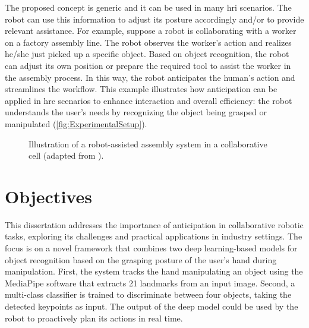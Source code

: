 The proposed concept is generic and it can be used in many \acf{hri} scenarios. The robot can use this information to adjust its posture accordingly and/or to provide relevant assistance. For example, suppose a robot is collaborating with a worker on a factory assembly line. The robot observes the worker's action and realizes he/she just picked up a specific object. Based on object recognition, the robot can adjust its own position or prepare the required tool to assist the worker in the assembly process. In this way, the robot anticipates the human's action and streamlines the workflow. This example illustrates how anticipation can be applied in \acs{hrc} scenarios to enhance interaction and overall efficiency: the robot understands the user's needs by recognizing the object being grasped or manipulated (\autoref{fig:ExperimentalSetup}).

\begin{figure}[ht]
    \captionsetup{width=0.7\textwidth}
    \centering
    {\fontsize{10}{12}\selectfont}
    \caption[Illustration of a robot-assisted assembly system in a collaborative cell.]{Illustration of a robot-assisted assembly system in a collaborative cell (adapted from \cite{Malik2020}).}
    \label{fig:ExperimentalSetup}
\end{figure}

\section{Objectives}

This dissertation addresses the importance of anticipation in collaborative robotic tasks, exploring its challenges and practical applications in industry settings. The focus is on a novel framework that combines two deep learning-based models for object recognition based on the grasping posture of the user's hand during manipulation. First, the system tracks the hand manipulating an object using the MediaPipe software \cite{Lugaresi2019} that extracts 21 landmarks from an input image. Second, a multi-class classifier is trained to discriminate between four objects, taking the detected keypoints as input. The output of the deep model could be used by the robot to proactively plan its actions in real time.


